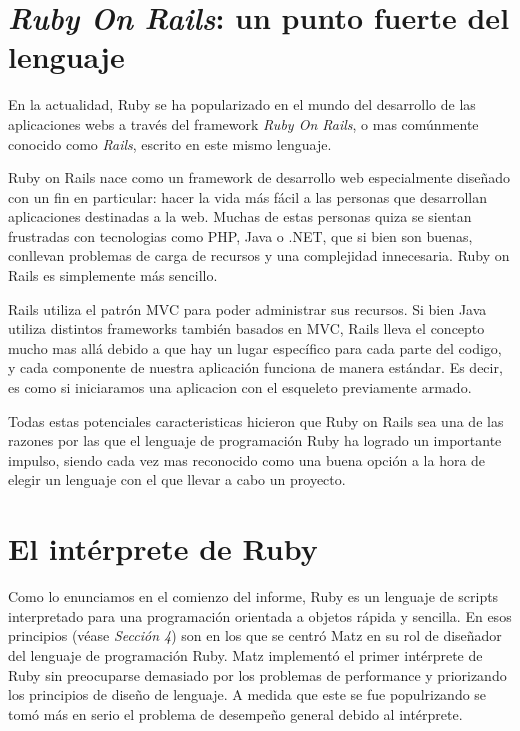 \documentclass{article}
\begin{document}
\section{\textit{Ruby On Rails}: un punto fuerte del lenguaje}

	En la actualidad, Ruby se ha popularizado en el mundo del desarrollo de las aplicaciones webs a través del framework \textit{Ruby On Rails}, o mas comúnmente conocido como \textit{Rails}, escrito en este mismo lenguaje.
	\par
	Ruby on Rails nace como un framework de desarrollo web especialmente diseñado con un fin en particular: hacer la vida más fácil a las personas que desarrollan aplicaciones destinadas a la web. Muchas de estas personas quiza se sientan frustradas con tecnologias como PHP, Java o .NET, que si bien son buenas, conllevan problemas de carga de recursos y una complejidad innecesaria. Ruby on Rails es simplemente más sencillo.
	\par
	Rails utiliza el patrón MVC para poder administrar sus recursos. Si bien Java utiliza distintos frameworks también basados en MVC, Rails lleva el concepto mucho mas allá debido a que hay un lugar específico para cada parte del codigo, y cada componente de nuestra aplicación funciona de manera estándar. Es decir, es como si iniciaramos una aplicacion con el esqueleto previamente armado.
	\par
	Todas estas potenciales caracteristicas hicieron que Ruby on Rails sea una de las razones por las que el lenguaje de programación Ruby ha logrado un importante impulso, siendo cada vez mas reconocido como una buena opción a la hora de elegir un lenguaje con el que llevar a cabo un proyecto.
\bigskip




\section{El intérprete de Ruby}

	Como lo enunciamos en el comienzo del informe, Ruby es un lenguaje de scripts interpretado para una programación orientada a objetos rápida y sencilla. En esos principios (véase \textit{Sección 4}) son en los que se centró Matz en su rol de diseñador del lenguaje de programación Ruby. Matz implementó el primer intérprete de Ruby sin preocuparse demasiado por los problemas de performance y priorizando los principios de diseño de lenguaje. A medida que este se fue populrizando se tomó más en serio el problema de desempeño general debido al intérprete.
\bigskip
\end{document}
